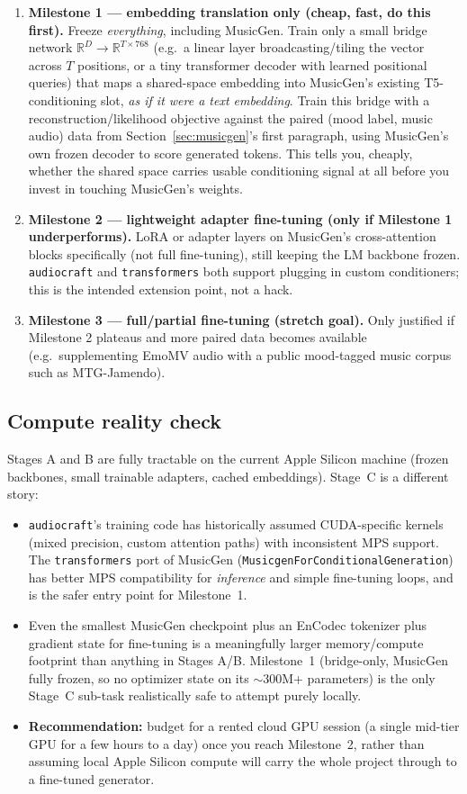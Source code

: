 \documentclass[11pt]{article}
\begin{document}
\begin{enumerate}
\item \textbf{Milestone 1 --- embedding translation only (cheap, fast, do this first).} Freeze
\emph{everything}, including MusicGen. Train only a small bridge network
$\mathbb{R}^{D} \to \mathbb{R}^{T \times 768}$ (e.g.\ a linear layer broadcasting/tiling the
vector across $T$ positions, or a tiny transformer decoder with learned positional queries) that
maps a shared-space embedding into MusicGen's existing T5-conditioning slot, \emph{as if it were
a text embedding}. Train this bridge with a reconstruction/likelihood objective against the
paired (mood label, music audio) data from Section~\ref{sec:musicgen}'s first paragraph, using
MusicGen's own frozen decoder to score generated tokens. This tells you, cheaply, whether the
shared space carries usable conditioning signal at all before you invest in touching MusicGen's
weights.
\item \textbf{Milestone 2 --- lightweight adapter fine-tuning (only if Milestone 1 underperforms).}
LoRA or adapter layers on MusicGen's cross-attention blocks specifically (not full fine-tuning),
still keeping the LM backbone frozen. \texttt{audiocraft} and \texttt{transformers} both support
plugging in custom conditioners; this is the intended extension point, not a hack.
\item \textbf{Milestone 3 --- full/partial fine-tuning (stretch goal).} Only justified if
Milestone 2 plateaus and more paired data becomes available (e.g.\ supplementing EmoMV audio with
a public mood-tagged music corpus such as MTG-Jamendo).
\end{enumerate}

\subsection{Compute reality check}
\label{sec:compute}
Stages A and B are fully tractable on the current Apple Silicon machine (frozen backbones, small
trainable adapters, cached embeddings). Stage~C is a different story:
\begin{itemize}
\item \texttt{audiocraft}'s training code has historically assumed CUDA-specific kernels (mixed
precision, custom attention paths) with inconsistent MPS support. The \texttt{transformers}
port of MusicGen (\texttt{MusicgenForConditionalGeneration}) has better MPS compatibility for
\emph{inference} and simple fine-tuning loops, and is the safer entry point for Milestone~1.
\item Even the smallest MusicGen checkpoint plus an EnCodec tokenizer plus gradient state for
fine-tuning is a meaningfully larger memory/compute footprint than anything in Stages A/B.
Milestone~1 (bridge-only, MusicGen fully frozen, so no optimizer state on its $\sim$300M+
parameters) is the only Stage~C sub-task realistically safe to attempt purely locally.
\item \textbf{Recommendation:} budget for a rented cloud GPU session (a single mid-tier GPU for a
few hours to a day) once you reach Milestone~2, rather than assuming local Apple Silicon compute
will carry the whole project through to a fine-tuned generator.
\end{itemize}
\end{document}
